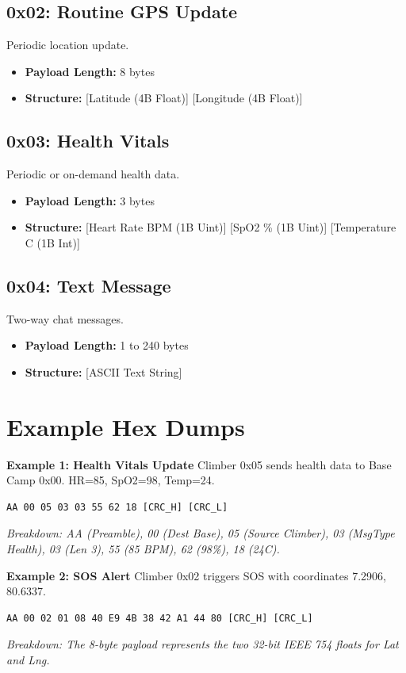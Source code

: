 \subsection{0x02: Routine GPS Update}
Periodic location update.
\begin{itemize}
    \item \textbf{Payload Length:} 8 bytes
    \item \textbf{Structure:} [Latitude (4B Float)] [Longitude (4B Float)]
\end{itemize}

\subsection{0x03: Health Vitals}
Periodic or on-demand health data.
\begin{itemize}
    \item \textbf{Payload Length:} 3 bytes
    \item \textbf{Structure:} [Heart Rate BPM (1B Uint)] [SpO2 \% (1B Uint)] [Temperature C (1B Int)]
\end{itemize}

\subsection{0x04: Text Message}
Two-way chat messages.
\begin{itemize}
    \item \textbf{Payload Length:} 1 to 240 bytes
    \item \textbf{Structure:} [ASCII Text String]
\end{itemize}

\section{Example Hex Dumps}

\textbf{Example 1: Health Vitals Update}
Climber 0x05 sends health data to Base Camp 0x00. HR=85, SpO2=98, Temp=24.
\begin{verbatim}
AA 00 05 03 03 55 62 18 [CRC_H] [CRC_L]
\end{verbatim}
\textit{Breakdown: AA (Preamble), 00 (Dest Base), 05 (Source Climber), 03 (MsgType Health), 03 (Len 3), 55 (85 BPM), 62 (98\%), 18 (24C).}

\textbf{Example 2: SOS Alert}
Climber 0x02 triggers SOS with coordinates 7.2906, 80.6337.
\begin{verbatim}
AA 00 02 01 08 40 E9 4B 38 42 A1 44 80 [CRC_H] [CRC_L]
\end{verbatim}
\textit{Breakdown: The 8-byte payload represents the two 32-bit IEEE 754 floats for Lat and Lng.}
